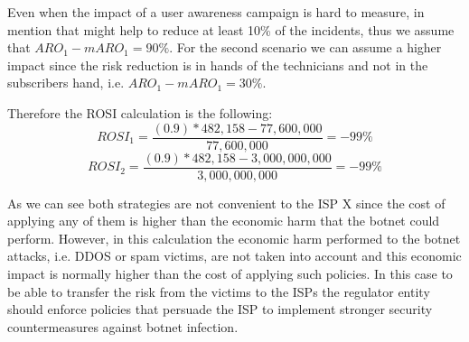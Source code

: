 Even when the impact of a user awareness campaign is hard to measure, in~\cite{uaw} mention that might help to reduce at least 10\% of the incidents, thus we assume that $ARO_1 - mARO_1=90\%$. For the second scenario we can assume a higher impact since the risk reduction is in hands of the technicians and not in the subscribers hand, i.e. $ARO_1 - mARO_1=30\%$.

Therefore the ROSI calculation is the following:
\[ROSI_1=\frac{(0.9)*482,158 -77,600,000}{ 77,600,000}=-99\%\]
\[ROSI_2=\frac{(0.9)*482,158 -3,000,000,000}{3,000,000,000}=-99\%\]

As we can see both strategies are not convenient to the ISP X since the cost of applying any of them is higher than the economic harm that the botnet could perform. However, in this calculation the economic harm performed to the botnet attacks, i.e. DDOS or spam victims, are not taken into account and this economic impact is normally higher than the cost of applying such policies. In this case to be able to transfer the risk from the victims to the ISPs the regulator entity should enforce policies that persuade the ISP to implement stronger security countermeasures against botnet infection.


